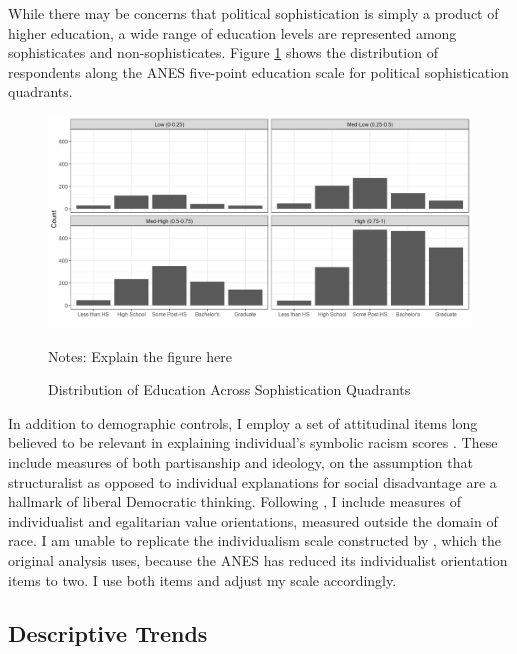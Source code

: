 \documentclass[12pt]{paper}
\begin{document}
While there may be concerns that political sophistication is simply a product of higher education, a wide range of education levels are represented among sophisticates and non-sophisticates. Figure \ref{educ} shows the distribution of respondents along the ANES five-point education scale for political sophistication quadrants. 

\begin{figure}[H]
	\centering
	\includegraphics[scale=.5]{fig/soph-education.png}
	{\singlespacing
		\parbox{0.78\textwidth}{\scriptsize%
			Notes: Explain the figure here
	}}
	\caption{Distribution of Education Across Sophistication Quadrants}
	\label{educ}
\end{figure}


In addition to demographic controls, I employ a set of attitudinal items long believed to be relevant in explaining individual's symbolic racism scores \citep{kinder_divided_1997, sears_symbolic_1988}. These include measures of both partisanship and ideology, on the assumption that structuralist as opposed to individual explanations for social disadvantage are a hallmark of liberal Democratic thinking. Following \cite{feldman_structure_1988}, I include measures of individualist and egalitarian value orientations, measured outside the domain of race. I am unable to replicate the individualism scale constructed by \cite{henry_symbolic_2002}, which the original analysis uses, because the ANES has reduced its individualist orientation items to two. I use both items and adjust my scale accordingly.


\subsection{Descriptive Trends}
\end{document}
